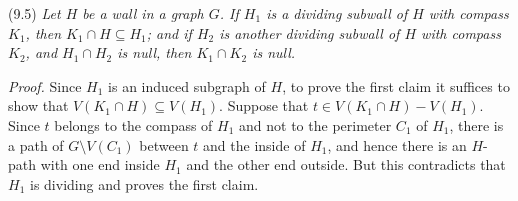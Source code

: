 \stmt
(9.5) \textit{Let $H$ be a wall in a graph $G$. If $H_1$ is a dividing subwall of $H$ with compass $K_1$, then $K_1 \cap H \subseteq H_1$; and if $H_2$ is another dividing subwall of $H$ with compass $K_2$, and $H_1 \cap H_2$ is null, then $K_1 \cap K_2$ is null.}

\textit{Proof.} Since $H_1$ is an induced subgraph of $H$, to prove the first claim it suffices to show that $V(K_1 \cap H) \subseteq V(H_1)$. Suppose that $t \in V(K_1 \cap H) - V(H_1)$. Since $t$ belongs to the compass of $H_1$ and not to the perimeter $C_1$ of $H_1$, there is a path of $G \setminus V(C_1)$ between $t$ and the inside of $H_1$, and hence there is an $H$-path with one end inside $H_1$ and the other end outside. But this contradicts that $H_1$ is dividing and proves the first claim.
